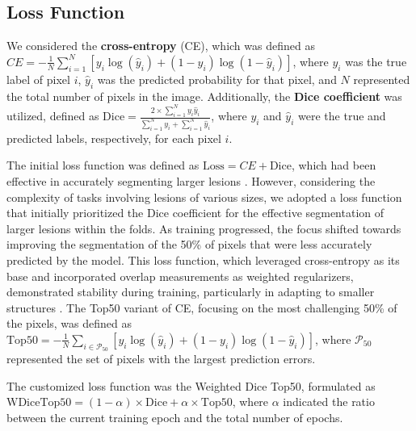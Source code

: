 \documentclass{article}
\begin{document}
\subsection{Loss Function}
We considered the \textbf{cross-entropy} (CE), which was defined as \( CE = -\frac{1}{N} \sum_{i=1}^{N} \left[ y_i \log(\hat{y}_i) + (1 - y_i) \log(1 - \hat{y}_i) \right] \), where \( y_i \) was the true label of pixel \( i \), \( \hat{y}_i \) was the predicted probability for that pixel, and \( N \) represented the total number of pixels in the image. Additionally, the \textbf{Dice coefficient} was utilized, defined as \( \text{Dice} = \frac{2 \times \sum_{i=1}^{N} y_i \hat{y}_i}{\sum_{i=1}^{N} y_i + \sum_{i=1}^{N} \hat{y}_i} \), where \( y_i \) and \( \hat{y}_i \) were the true and predicted labels, respectively, for each pixel \( i \).

The initial loss function was defined as \( \text{Loss} = CE + \text{Dice} \), which had been effective in accurately segmenting larger lesions \cite{R10}. However, considering the complexity of tasks involving lesions of various sizes, we adopted a loss function that initially prioritized the Dice coefficient for the effective segmentation of larger lesions within the folds. As training progressed, the focus shifted towards improving the segmentation of the 50\% of pixels that were less accurately predicted by the model. This loss function, which leveraged cross-entropy as its base and incorporated overlap measurements as weighted regularizers, demonstrated stability during training, particularly in adapting to smaller structures \cite{R9}. The Top50 variant of CE, focusing on the most challenging 50\% of the pixels, was defined as \( \text{Top50} = -\frac{1}{N} \sum_{i \in \mathcal{P}_{50}} \left[ y_i \log(\hat{y}_i) + (1 - y_i) \log(1 - \hat{y}_i) \right] \), where \( \mathcal{P}_{50} \) represented the set of pixels with the largest prediction errors.

The customized loss function was the Weighted Dice Top50, formulated as \( \text{WDiceTop50} = (1 - \alpha) \times \text{Dice} + \alpha \times \text{Top50} \), where \( \alpha \) indicated the ratio between the current training epoch and the total number of epochs.
\end{document}
